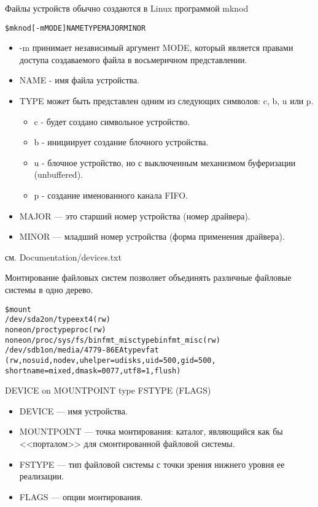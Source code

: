 \documentclass{beamer}
\begin{document}
\begin{frame}[fragile]
\begin{block}{Файлы устройств обычно создаются в Linux программой mknod}
\begin{alltt}
\$ mknod [-m MODE] NAME TYPE MAJOR MINOR
\end{alltt}
\end{block}
\begin{itemize}
\item -m принимает независимый аргумент MODE, который является правами доступа создаваемого файла в восьмеричном представлении.
\item NAME - имя файла устройства.
\item TYPE может быть представлен одним из следующих символов: c, b, u или p. 
\begin{itemize}
\item c - будет создано символьное устройство. 
\item b - инициирует создание блочного устройства. 
\item u - блочное устройство, но с выключенным механизмом буферизации (unbuffered). 
\item p - создание именованного канала FIFO.
\end{itemize}
\item MAJOR — это старший номер устройства (номер драйвера).
\item MINOR — младший номер устройства (форма применения драйвера).
\end{itemize}
см. Documentation/devices.txt
\end{frame}

\begin{frame}[fragile]
\begin{block}{Монтирование файловых систем}
позволяет объединять различные файловые системы в одно дерево.
\end{block}
\begin{alltt}
\$ mount
/dev/sda2 on / type ext4 (rw)
none on /proc type proc (rw)
none on /proc/sys/fs/binfmt_misc type binfmt_misc (rw)
/dev/sdb1 on /media/4779-86EA type vfat
(rw,nosuid,nodev,uhelper=udisks,uid=500,gid=500,
shortname=mixed,dmask=0077, utf8=1,flush)
\end{alltt}
DEVICE on MOUNTPOINT type FSTYPE (FLAGS)
\begin{itemize}
\item DEVICE — имя устройства.
\item MOUNTPOINT — точка монтирования: каталог, являющийся как бы <<порталом>> для смонтированной файловой системы. 
\item FSTYPE — тип файловой системы с точки зрения нижнего уровня ее реализации.
\item FLAGS — опции монтирования. 
\end{itemize}
\end{frame}
\end{document}
